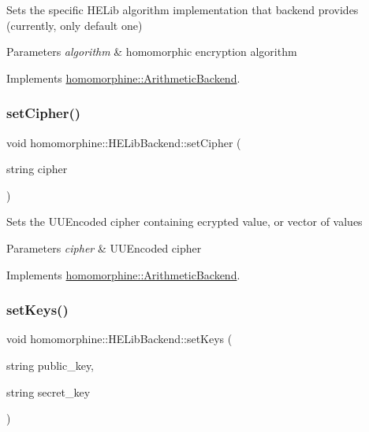Sets the specific H\+E\+Lib algorithm implementation that backend provides (currently, only default one)


\begin{DoxyParams}{Parameters}
{\em algorithm} & homomorphic encryption algorithm \\
\hline
\end{DoxyParams}


Implements \mbox{\hyperlink{classhomomorphine_1_1_arithmetic_backend_ac53135f4f66a2f7a33d3c6e6d465b86f}{homomorphine\+::\+Arithmetic\+Backend}}.

\mbox{\label{classhomomorphine_1_1_h_e_lib_backend_a5baa6ad05fbb23d27c4ec4bb018a8c64}} 
\subsubsection{\texorpdfstring{setCipher()}{setCipher()}}
{\footnotesize\ttfamily void homomorphine\+::\+H\+E\+Lib\+Backend\+::set\+Cipher (\begin{DoxyParamCaption}\item[{string}]{cipher }\end{DoxyParamCaption})\hspace{0.3cm}{\ttfamily [virtual]}}

Sets the U\+U\+Encoded cipher containing ecrypted value, or vector of values


\begin{DoxyParams}{Parameters}
{\em cipher} & U\+U\+Encoded cipher \\
\hline
\end{DoxyParams}


Implements \mbox{\hyperlink{classhomomorphine_1_1_arithmetic_backend_af9b2d3b33a03d79facdf113c9560fc0b}{homomorphine\+::\+Arithmetic\+Backend}}.

\mbox{\label{classhomomorphine_1_1_h_e_lib_backend_a2980c8eaf3556057aac364a1e61ab8cd}} 
\subsubsection{\texorpdfstring{setKeys()}{setKeys()}}
{\footnotesize\ttfamily void homomorphine\+::\+H\+E\+Lib\+Backend\+::set\+Keys (\begin{DoxyParamCaption}\item[{string}]{public\+\_\+key,  }\item[{string}]{secret\+\_\+key }\end{DoxyParamCaption})\hspace{0.3cm}{\ttfamily [virtual]}}

